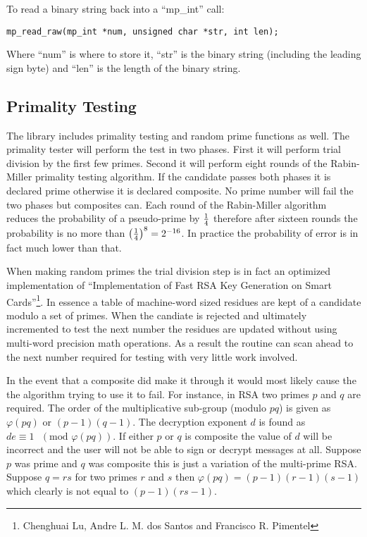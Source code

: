 \documentclass{book}
\def\phi{\varphi}
\begin{document}
To read a binary string back into a ``mp\_int'' call:
\begin{verbatim}
mp_read_raw(mp_int *num, unsigned char *str, int len);
\end{verbatim}
Where ``num'' is where to store it, ``str'' is the binary string (including the leading sign byte) and ``len'' is the 
length of the binary string.

\subsection{Primality Testing}
The library includes primality testing and random prime functions as well.  The primality tester will perform the test in
two phases.  First it will perform trial division by the first few primes.  Second it will perform eight rounds of the 
Rabin-Miller primality testing algorithm.  If the candidate passes both phases it is declared prime otherwise it is declared
composite.  No prime number will fail the two phases but composites can.  Each round of the Rabin-Miller algorithm reduces
the probability of a pseudo-prime by $1 \over 4$ therefore after sixteen rounds the probability is no more than 
$\left ( { 1 \over 4 } \right )^{8} = 2^{-16}$.  In practice the probability of error is in fact much lower than that.

When making random primes the trial division step is in fact an optimized implementation of ``Implementation of Fast RSA Key Generation on Smart Cards''\footnote{Chenghuai Lu, Andre L. M. dos Santos and Francisco R. Pimentel}.
In essence a table of machine-word sized residues are kept of a candidate modulo a set of primes.  When the candiate
is rejected and ultimately incremented to test the next number the residues are updated without using multi-word precision
math operations.  As a result the routine can scan ahead to the next number required for testing with very little work
involved.

In the event that a composite did make it through it would most likely cause the the algorithm trying to use it to fail.  For 
instance, in RSA two primes $p$ and $q$ are required.  The order of the multiplicative sub-group (modulo $pq$) is given 
as $\phi(pq)$ or $(p - 1)(q - 1)$.  The decryption exponent $d$ is found as $de \equiv 1\mbox{ }(\mbox{mod } \phi(pq))$.  If either $p$ or $q$ is composite the value of $d$ will be incorrect and the user
will not be able to sign or decrypt messages at all.  Suppose $p$ was prime and $q$ was composite this is just a variation of 
the multi-prime RSA.  Suppose $q = rs$ for two primes $r$ and $s$ then $\phi(pq) = (p - 1)(r - 1)(s - 1)$ which clearly is 
not equal to $(p - 1)(rs - 1)$.
\end{document}
